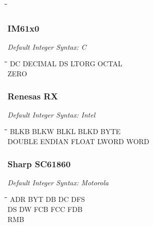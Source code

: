 {\tt\begin{tabbing}
\hspace{3cm}\=\hspace{3cm}\=\hspace{3cm}\=\hspace{3cm}\=\kill
\end{tabbing}}

\subsubsection{IM61x0}

{\em Default Integer Syntax: C}

{\tt\begin{tabbing}
\hspace{3cm}\=\hspace{3cm}\=\hspace{3cm}\=\hspace{3cm}\=\kill
DC         \> DECIMAL     \> DS          \> LTORG       \> OCTAL \\
ZERO \\
\end{tabbing}}

\subsubsection{Renesas RX}

{\em Default Integer Syntax: Intel}

{\tt\begin{tabbing}
\hspace{3cm}\=\hspace{3cm}\=\hspace{3cm}\=\hspace{3cm}\=\kill
BLKB       \> BLKW        \> BLKL        \> BLKD        \> BYTE \\
DOUBLE     \> ENDIAN      \> FLOAT       \> LWORD       \> WORD \\
\end{tabbing}}

\subsubsection{Sharp SC61860}

{\em Default Integer Syntax: Motorola}

{\tt\begin{tabbing}
\hspace{3cm}\=\hspace{3cm}\=\hspace{3cm}\=\hspace{3cm}\=\kill
ADR        \> BYT         \> DB          \> DC          \> DFS \\
DS         \> DW          \> FCB         \> FCC         \> FDB \\
RMB \\
\end{tabbing}}

